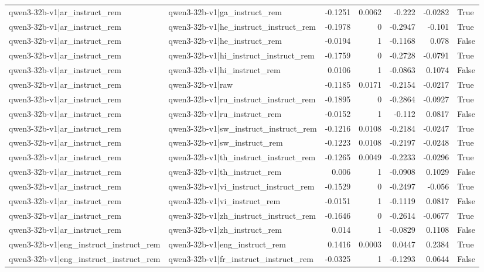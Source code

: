 \begin{table}
\begin{tabular}{l l r r r r l}
qwen3-32b-v1|ar_instruct_rem & qwen3-32b-v1|ga_instruct_rem & -0.1251 & 0.0062 & -0.222 & -0.0282 & True \\
qwen3-32b-v1|ar_instruct_rem & qwen3-32b-v1|he_instruct_instruct_rem & -0.1978 & 0 & -0.2947 & -0.101 & True \\
qwen3-32b-v1|ar_instruct_rem & qwen3-32b-v1|he_instruct_rem & -0.0194 & 1 & -0.1168 & 0.078 & False \\
qwen3-32b-v1|ar_instruct_rem & qwen3-32b-v1|hi_instruct_instruct_rem & -0.1759 & 0 & -0.2728 & -0.0791 & True \\
qwen3-32b-v1|ar_instruct_rem & qwen3-32b-v1|hi_instruct_rem & 0.0106 & 1 & -0.0863 & 0.1074 & False \\
qwen3-32b-v1|ar_instruct_rem & qwen3-32b-v1|raw & -0.1185 & 0.0171 & -0.2154 & -0.0217 & True \\
qwen3-32b-v1|ar_instruct_rem & qwen3-32b-v1|ru_instruct_instruct_rem & -0.1895 & 0 & -0.2864 & -0.0927 & True \\
qwen3-32b-v1|ar_instruct_rem & qwen3-32b-v1|ru_instruct_rem & -0.0152 & 1 & -0.112 & 0.0817 & False \\
qwen3-32b-v1|ar_instruct_rem & qwen3-32b-v1|sw_instruct_instruct_rem & -0.1216 & 0.0108 & -0.2184 & -0.0247 & True \\
qwen3-32b-v1|ar_instruct_rem & qwen3-32b-v1|sw_instruct_rem & -0.1223 & 0.0108 & -0.2197 & -0.0248 & True \\
qwen3-32b-v1|ar_instruct_rem & qwen3-32b-v1|th_instruct_instruct_rem & -0.1265 & 0.0049 & -0.2233 & -0.0296 & True \\
qwen3-32b-v1|ar_instruct_rem & qwen3-32b-v1|th_instruct_rem & 0.006 & 1 & -0.0908 & 0.1029 & False \\
qwen3-32b-v1|ar_instruct_rem & qwen3-32b-v1|vi_instruct_instruct_rem & -0.1529 & 0 & -0.2497 & -0.056 & True \\
qwen3-32b-v1|ar_instruct_rem & qwen3-32b-v1|vi_instruct_rem & -0.0151 & 1 & -0.1119 & 0.0817 & False \\
qwen3-32b-v1|ar_instruct_rem & qwen3-32b-v1|zh_instruct_instruct_rem & -0.1646 & 0 & -0.2614 & -0.0677 & True \\
qwen3-32b-v1|ar_instruct_rem & qwen3-32b-v1|zh_instruct_rem & 0.014 & 1 & -0.0829 & 0.1108 & False \\
qwen3-32b-v1|eng_instruct_instruct_rem & qwen3-32b-v1|eng_instruct_rem & 0.1416 & 0.0003 & 0.0447 & 0.2384 & True \\
qwen3-32b-v1|eng_instruct_instruct_rem & qwen3-32b-v1|fr_instruct_instruct_rem & -0.0325 & 1 & -0.1293 & 0.0644 & False \\

\end{tabular}
\end{table}
